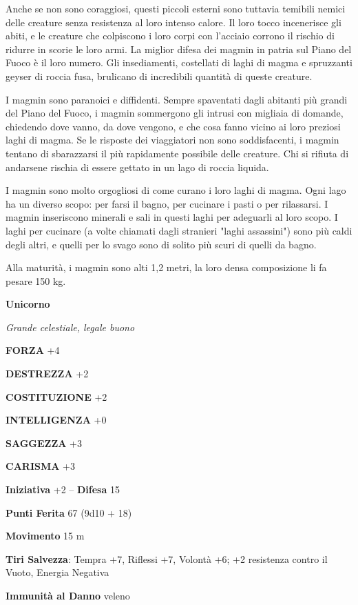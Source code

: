 \begin{multicols}{2}
Anche se non sono coraggiosi, questi piccoli esterni sono tuttavia temibili nemici delle creature senza resistenza al loro intenso calore. Il loro tocco incenerisce gli abiti, e le creature che colpiscono i loro corpi con l'acciaio corrono il rischio di ridurre in scorie le loro armi. La miglior difesa dei magmin in patria sul Piano del Fuoco è il loro numero. Gli insediamenti, costellati di laghi di magma e spruzzanti geyser di roccia fusa, brulicano di incredibili quantità di queste creature.

I magmin sono paranoici e diffidenti. Sempre spaventati dagli abitanti più grandi del Piano del Fuoco, i magmin sommergono gli intrusi con migliaia di domande, chiedendo dove vanno, da dove vengono, e che cosa fanno vicino ai loro preziosi laghi di magma. Se le risposte dei viaggiatori non sono soddisfacenti, i magmin tentano di sbarazzarsi il più rapidamente possibile delle creature. Chi si rifiuta di andarsene rischia di essere gettato in un lago di roccia liquida.

I magmin sono molto orgogliosi di come curano i loro laghi di magma. Ogni lago ha un diverso scopo: per farsi il bagno, per cucinare i pasti o per rilassarsi. I magmin inseriscono minerali e sali in questi laghi per adeguarli al loro scopo. I laghi per cucinare (a volte chiamati dagli stranieri "laghi assassini") sono più caldi degli altri, e quelli per lo svago sono di solito più scuri di quelli da bagno.

Alla maturità, i magmin sono alti 1,2 metri, la loro densa composizione li fa pesare 150 kg.

\medskip{}\textbf{Unicorno}

\textit{Grande celestiale, legale buono}

\textbf{FORZA} +4

\textbf{DESTREZZA} +2

\textbf{COSTITUZIONE} +2

\textbf{INTELLIGENZA} +0

\textbf{SAGGEZZA} +3

\textbf{CARISMA} +3

\textbf{Iniziativa} +2 -- \textbf{Difesa} 15

\textbf{Punti Ferita} 67 (9d10 + 18)

\textbf{Movimento} 15 m

\textbf{Tiri Salvezza}: Tempra +7, Riflessi +7, Volontà +6; +2 resistenza contro il Vuoto, Energia Negativa

\textbf{Immunità al Danno} veleno


\end{multicols}
